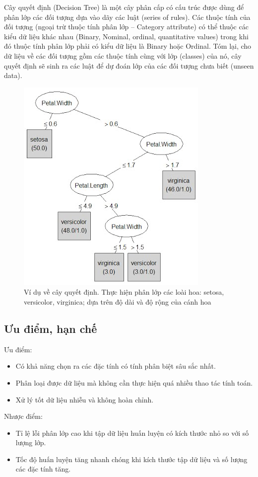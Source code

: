 Cây quyết định (Decision Tree) là một cây phân cấp có cấu trúc được dùng để phân lớp các đối tượng dựa vào dãy các luật (series of rules). Các thuộc tính của đối tượng (ngoại trừ thuộc tính phân lớp – Category attribute) có thể thuộc các kiểu dữ liệu khác nhau (Binary, Nominal, ordinal, quantitative values) trong khi đó thuộc tính phân lớp phải có kiểu dữ liệu là Binary hoặc Ordinal. Tóm lại, cho dữ liệu về các đối tượng gồm các thuộc tính cùng với lớp (classes) của nó, cây quyết định sẽ sinh ra các luật để dự đoán lớp của các đối tượng chưa biết (unseen data).
\begin{figure}[H]
\centering
\includegraphics[width=0.9\linewidth]{Chapter2/Chapter2Figs/J48.png}
\caption{Ví dụ về cây quyết định. Thực hiện phân lớp các loài hoa: setosa, versicolor, virginica; dựa trên độ dài và độ rộng của cánh hoa}
\end{figure}
\subsection{Ưu điểm, hạn chế}
Ưu điểm:
\begin{itemize}
  \item Có khả năng chọn ra các đặc tính có tính phân biệt sâu sắc nhất.
  \item Phân loại được dữ liệu mà không cần thực hiện quá nhiều thao tác tính toán.
  \item Xử lý tốt dữ liệu nhiễu và không hoàn chỉnh.
\end{itemize}
Nhược điểm:
\begin{itemize}
  \item Tỉ lệ lỗi phân lớp cao khi tập dữ liệu huấn luyện có kích thước nhỏ so với số lượng lớp.
  \item Tốc độ huấn luyện tăng nhanh chóng khi kích thước tập dữ liệu và số lượng các đặc tính tăng.
\end{itemize}

